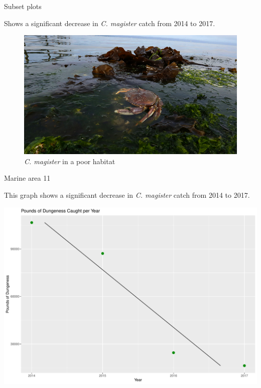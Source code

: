 \documentclass[ignorenonframetext,]{beamer}
\begin{document}
\begin{frame}{Subset plots}

Shows a significant decrease in \emph{C. magister} catch from 2014 to
2017.

\begin{figure}
\centering
\includegraphics{../Images/dungeness_decline.jpg}
\caption{\emph{C. magister} in a poor habitat}
\end{figure}

\end{frame}

\begin{frame}{Marine area 11}

This graph shows a significant decrease in \emph{C. magister} catch from
2014 to 2017.

\includegraphics{Claudia-dungeness_files/figure-beamer/subset plot area 11-1.pdf}

\end{frame}
\end{document}
